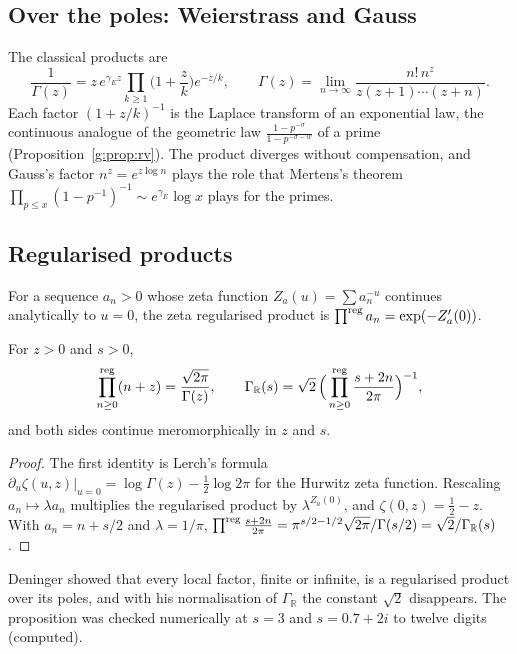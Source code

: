 \subsection{Over the poles: Weierstrass and Gauss}

The classical products are
\[
\frac1{\Gamma(z)}=z\,e^{\gamma_Ez}\prod_{k\ge1}\Big(1+\frac zk\Big)e^{-z/k},\qquad
\Gamma(z)=\lim_{n\to\infty}\frac{n!\,n^z}{z(z+1)\cdots(z+n)} .
\]
Each factor $(1+z/k)^{-1}$ is the Laplace transform of an exponential law, the continuous analogue of the geometric law $\frac{1-p^{-\sigma}}{1-p^{-\sigma-w}}$ of a prime (Proposition~\ref{g:prop:rv}). The product diverges without compensation, and Gauss's factor $n^z=e^{z\log n}$ plays the role that Mertens's theorem $\prod_{p\le x}(1-p^{-1})^{-1}\sim e^{\gamma_E}\log x$ plays for the primes.

\subsection{Regularised products}

For a sequence $a_n>0$ whose zeta function $Z_a(u)=\sum a_n^{-u}$ continues analytically to $u=0$, the zeta regularised product is $\prod^{\rm reg}a_n=\exp(-Z_a'(0))$.

\begin{proposition}\label{g:prop:reg}
For $z>0$ and $s>0$,
\[
\prod^{\rm reg}_{n\ge0}(n+z)=\frac{\sqrt{2\pi}}{\Gamma(z)},\qquad
\Gamma_{\mathbb R}(s)=\sqrt2\,\Big(\prod^{\rm reg}_{n\ge0}\frac{s+2n}{2\pi}\Big)^{-1},
\]
and both sides continue meromorphically in $z$ and $s$.
\end{proposition}

\begin{proof}
The first identity is Lerch's formula $\partial_u\zeta(u,z)|_{u=0}=\log\Gamma(z)-\frac12\log2\pi$ for the Hurwitz zeta function. Rescaling $a_n\mapsto\lambda a_n$ multiplies the regularised product by $\lambda^{Z_a(0)}$, and $\zeta(0,z)=\frac12-z$. With $a_n=n+s/2$ and $\lambda=1/\pi$, $\prod^{\rm reg}\frac{s+2n}{2\pi}=\pi^{s/2-1/2}\sqrt{2\pi}/\Gamma(s/2)=\sqrt2/\Gamma_{\mathbb R}(s)$.
\end{proof}

Deninger \cite{Deninger92} showed that every local factor, finite or infinite, is a regularised product over its poles, and with his normalisation of $\Gamma_{\mathbb R}$ the constant $\sqrt2$ disappears. The proposition was checked numerically at $s=3$ and $s=0.7+2i$ to twelve digits (computed).

